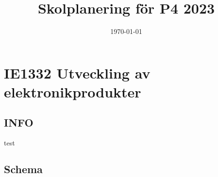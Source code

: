 \documentclass[11pt]{article}
\date{\today}
\title{Skolplanering för P4 2023}
\begin{document}
\maketitle
\tableofcontents


\section{IE1332 Utveckling av elektronikprodukter}
\label{sec:org5177fc5}
\subsection{INFO}
\label{sec:org6224635}
test

\subsection{Schema}
\label{sec:org5f14857}
\end{document}
